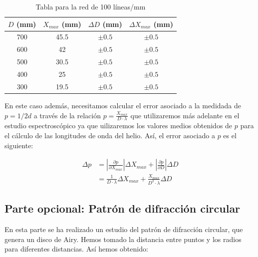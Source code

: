 \documentclass[11pt, a4paper, twocolumn]{article}
\begin{document}
\begin{table}[H]
    \caption{Tabla para la red de 100 líneas/mm}
    \centering
    \small
    \setlength{\tabcolsep}{4pt}

    \begin{tabular}{cccc}
        \hline
        $D$ (mm) &   $X_{max}$ (mm) & $\Delta D$ (mm)   & $\Delta X_{max}$ (mm)   \\
        \hline
            700 &             45.5 & $\pm 0.5$         & $\pm 0.5$               \\
            600 &             42   & $\pm 0.5$         & $\pm 0.5$               \\
            500 &             30.5 & $\pm 0.5$         & $\pm 0.5$               \\
            400 &             25   & $\pm 0.5$         & $\pm 0.5$               \\
            300 &             19.5 & $\pm 0.5$         & $\pm 0.5$               \\
        \hline
    \end{tabular}

\end{table}

En este caso además, necesitamos calcular el error asociado a la medidada de $p = 1/2d$ a través de la relación $p = \frac{X_{max}}{D \cdot \lambda}$ que utilizaremos
más adelante en el estudio espectroscópico ya que uilizaremos los valores medios obtenidos de $p$ para el cálculo de las longitudes de onda del helio. Así, el error asociado a $p$ es el siguiente:

\begin{align}
    \Delta p &= \left|\frac{\partial p}{\partial X_{max}}\right|\Delta X_{max} + \left|\frac{\partial p}{\partial D}\right|\Delta D \\
    &= \frac{1}{D \cdot \lambda} \Delta X_{max} + \frac{X_{max}}{D^2 \cdot \lambda} \Delta D
\end{align}

\subsection{Parte opcional: Patrón de difracción circular}
En esta parte se ha realizado un estudio del patrón de difracción circular, que genera un disco de Airy. Hemos tomado la distancia entre puntos y los radios para diferentes distancias. Así hemos obtenido: 
\end{document}
